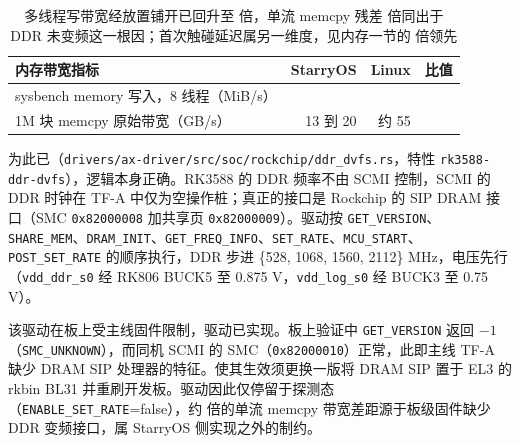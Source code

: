 \begin{table}[H]\centering\small
\begin{tabular}{@{}lrrr@{}}
\toprule
内存带宽指标 & StarryOS & Linux & 比值 \\
\midrule
sysbench memory 写入，8 线程（MiB/s） & \nMemBWWrite{} & \nMemBWWriteLin{} & \nMemBWWriteRatio{} \\
1M 块 memcpy 原始带宽（GB/s） & 13 到 20 & 约 55 & \nMemBWMemcpyRatio{} \\
\bottomrule
\end{tabular}
\caption{多线程写带宽经放置铺开已回升至 \nMemBWWriteRatio{} 倍，单流 memcpy 残差 \nMemBWMemcpyRatio{} 倍同出于 DDR 未变频这一根因；首次触碰延迟属另一维度，见内存一节的 \nThpRatio{} 倍领先}
\end{table}

为此已（\texttt{drivers/ax-driver/src/soc/rockchip/ddr\_dvfs.rs}，特性 \texttt{rk3588-ddr-dvfs}），逻辑本身正确。RK3588 的 DDR 频率不由 SCMI 控制，SCMI 的 DDR 时钟在 TF-A 中仅为空操作桩；真正的接口是 Rockchip 的 SIP DRAM 接口（SMC \texttt{0x82000008} 加共享页 \texttt{0x82000009}）。驱动按 \texttt{GET\_VERSION}、\texttt{SHARE\_MEM}、\texttt{DRAM\_INIT}、\texttt{GET\_FREQ\_INFO}、\texttt{SET\_RATE}、\texttt{MCU\_START}、\texttt{POST\_SET\_RATE} 的顺序执行，DDR 步进 \{528, 1068, 1560, 2112\} MHz，电压先行（\texttt{vdd\_ddr\_s0} 经 RK806 BUCK5 至 0.875 V，\texttt{vdd\_log\_s0} 经 BUCK3 至 0.75 V）。

该驱动在板上受主线固件限制，驱动已实现。板上验证中 \texttt{GET\_VERSION} 返回 $-1$（\texttt{SMC\_UNKNOWN}），而同机 SCMI 的 SMC（\texttt{0x82000010}）正常，此即主线 TF-A 缺少 DRAM SIP 处理器的特征。使其生效须更换一版将 DRAM SIP 置于 EL3 的 rkbin BL31 并重刷开发板。驱动因此仅停留于探测态（\texttt{ENABLE\_SET\_RATE}=false），约 \nMemBWMemcpyRatio{} 倍的单流 memcpy 带宽差距源于板级固件缺少 DDR 变频接口，属 StarryOS 侧实现之外的制约。
